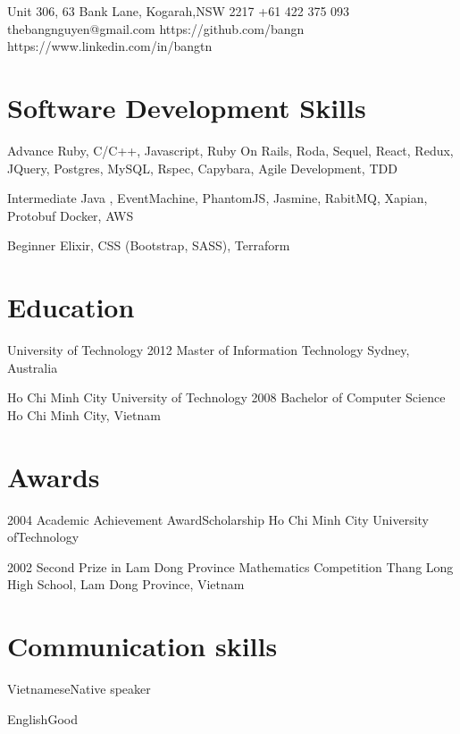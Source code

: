 \documentclass{tccv}
\begin{document}
\personal
    {Unit 306, 63 Bank Lane, Kogarah,\newline NSW 2217}
    {+61 422 375 093}
    {thebangnguyen@gmail.com}
    {https://github.com/bangn}
    {https://www.linkedin.com/in/bangtn}

\section{Software Development Skills}

\begin{factlist}

\item{Advance}
     {Ruby, C/C++, Javascript,
     Ruby On Rails, Roda, Sequel, React, Redux, JQuery,
     Postgres, MySQL,
     \newline Rspec, Capybara,
     \newline Agile Development, TDD}

\item{Intermediate}
     {Java , EventMachine, PhantomJS, Jasmine, RabitMQ, Xapian, Protobuf
     \newline Docker, AWS}

\item{Beginner}
     {Elixir, CSS (Bootstrap, SASS), Terraform}
\end{factlist}

\section{Education}

\begin{yearlist}

\item[University of Technology]{2012}
     {Master of Information Technology}
     {Sydney, Australia}

\item[Ho Chi Minh City University of Technology]{2008}
     {Bachelor of Computer Science}
     {Ho Chi Minh City, Vietnam}

\end{yearlist}

\section{Awards}

\begin{yearlist}

\item{2004}
     {Academic Achievement Award\newline Scholarship}
     {Ho Chi Minh City University of\newline Technology}

\item{2002}
     {Second Prize in Lam Dong Province Mathematics Competition}
     {Thang Long High School, Lam Dong Province, Vietnam}

\end{yearlist}

\section{Communication skills}

\begin{factlist}
\item{Vietnamese}{Native speaker}
\item{English}{Good}
\end{factlist}
\end{document}
